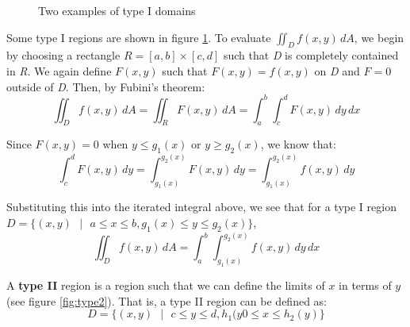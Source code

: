 \begin{figure}[htbp]
    \begin{minipage}{0.5\textwidth}
    \end{minipage}
    \caption{Two examples of type I domains}
    \label{fig:type1}
\end{figure}

Some type I regions are shown in figure \ref{fig:type1}. To evaluate $\iint_{
\textit{D}} f(x,y)\,dA$, we begin by choosing a rectangle $\textit{R} = \left[ 
a, b \right] \times \left[ c, d \right]$ such that \textit{D} is completely 
contained in \textit{R}. We again define $F(x, y)$ such that $F(x, y) = f(x,y)$
on \textit{D} and $F = 0$ outside of \textit{D}. Then, by Fubini's theorem:
$$\iint_{\textit{D}} f(x, y)\,dA = \iint_{\textit{R}} F(x, y)\,dA = \int_a^b 
\int_c^d F(x, y)\,dy\,dx$$

Since $F(x, y) = 0$ when $y \leq g_1(x)$ or $y \geq g_2(x)$, we know that:
$$\int_c^d F(x, y)\,dy = \int_{g_1(x)}^{g_2(x)} F(x, y)\,dy = \int_{g_1(x)}^{
g_2(x)} f(x, y)\,dy$$

Substituting this into the iterated integral above, we see that for a type I 
region $\textit{D} = \{ (x, y) \text{ } | \text{ } a \leq x \leq b, g_1(x) 
\leq y \leq g_2(x) \}$, 
$$\iint_{\textit{D}} f(x, y)\,dA = \int_a^b \int_{g_1(x)}^{g_2(x)} f(x, y)
\,dy\,dx$$

A \textbf{type II} region is a region such that we can define the limits of 
$x$ in terms of $y$ (see figure \ref{fig:type2}). That is, a type II region 
can be defined as:
$$\textit{D} = \{(x, y) \text{ } | \text{ } c \leq y \leq d, h_1(y0 \leq x 
\leq h_2(y) \}$$

